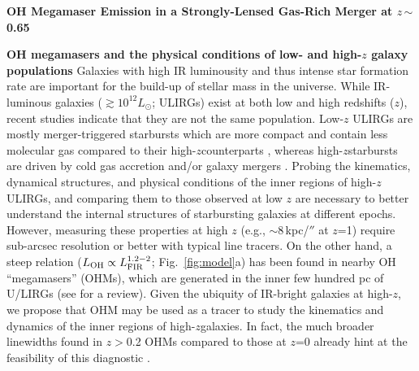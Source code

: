 \documentclass[letterpaper,11pt]{article}
\newcommand{\Lsun}{\mbox{$L_{\odot}$}\xspace}
\newcommand{\Fig}[1]{Fig.~\ref{fig:#1}}
\newcommand{\ssim}{\,$\sim$\,}
\newcommand{\highz}{high-$z$\space}
\newcommand{\galpop}{galaxy populations\xspace}
\begin{document}
\pagestyle{plain}



\begin{center}
{\large{\bf{OH Megamaser Emission in a Strongly-Lensed Gas-Rich Merger at $z$\ssim0.65}}}
\end{center}
\vspace{-.8em}
\textbf{OH megamasers and the physical conditions of low- and high-$z$ \galpop}
Galaxies with high IR luminousity and thus intense star formation rate are important for the build-up of stellar mass in the universe. 
While IR-luminous galaxies ($\gtrsim10^{12}$\Lsun; ULIRGs) 
exist at both low and high redshifts ($z$), recent studies indicate that they are not the same population. 
Low-$z$ ULIRGs are mostly merger-triggered starbursts which are more compact and contain
less molecular gas compared to their \highz counterparts \citep{Veilleux02a, Hopkins10a, Rujopakarn11a, Rujopakarn13a},
whereas \highz starbursts are driven by cold gas accretion \citep[e.g.,][]{Dekel09b} 
and/or galaxy mergers \citep{Riechers11a, Riechers13b, Hayward12a}.
Probing the kinematics, dynamical structures, and physical conditions of the inner regions of \highz ULIRGs, 
and comparing them to those observed at low $z$ 
are necessary to better understand the internal structures of starbursting galaxies at different epochs.
However, measuring these properties at high $z$ (e.g., $\sim$8\,kpc/$''$ at $z$=1)
require sub-arcsec resolution or better with typical line tracers. On the other hand, a 
steep relation ($L_{\rm OH}\propto L_{\rm FIR}^{1.2-2}$; \Fig{model}a) has been found in nearby OH ``megamasers'' 
(OHMs), which are generated in the inner few hundred pc of U/LIRGs (see \citealt[]{Lo05a} for a review).
Given the ubiquity of IR-bright galaxies at high-$z$, we propose that OHM may be used as a tracer to 
study the kinematics and dynamics of the inner regions of \highz galaxies.
In fact, the much broader linewidths found in $z$$>$0.2 OHMs compared to those at $z$=0 already hint at the feasibility of 
this diagnostic \citep[hereafter DG02]{Baan92a, Darling02a}.
\end{document}
